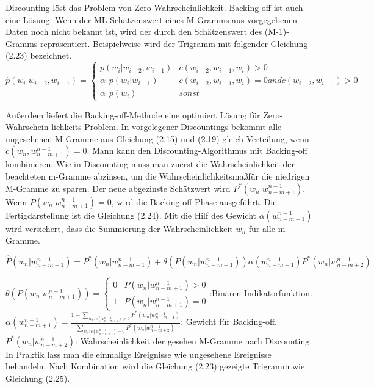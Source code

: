Discounting l\"ost das Problem von Zero-Wahrscheinlichkeit. Backing-off ist auch eine L\"osung. Wenn der ML-Sch\"atzenswert eines M-Gramms aus vorgegebenen Daten noch nicht bekannt ist, wird der durch den Sch\"atzenswert des (M-1)-Gramms repr\"asentiert. Beispielweise wird der Trigramm mit folgender Gleichung (2.23) bezeichnet.
\begin{equation}
\label{equation:backing_off_01}
	\hat{p}(w_{i}|w_{i-2},w_{i-1})=
	\begin{cases}
			p(w_{i}|w_{i-2},w_{i-1}) & c(w_{i-2},w_{i-1},w_{i})>0 \\
			\alpha_{1}p(w_{i}|w_{i-1})& c(w_{i-2},w_{i-1},w_{i})=0 and c(w_{i-2},w_{i-1})>0 \\
			\alpha_{1}p(w_{i}) & sonst 
	\end{cases}
\end{equation}

Au\ss erdem liefert die Backing-off-Methode eine optimiert L\"osung f\"ur Zero-Wahrschein-lichkeits-Problem. In vorgelegener Discountings bekommt alle ungesehenen M-Gramme aus Gleichung (2.15) und (2.19) gleich Verteilung, wenn $c(w_{n},w_{n-m+1}^{n-1})=0$. Mann kann den Discounting-Algorithmus mit Backing-off kombinieren. Wie in Discounting muss man zuerst die Wahrscheinlichkeit der beachteten m-Gramme abzinsen, um die Wahrscheinlichkeitsma\ss f\"ur die niedrigen M-Gramme zu sparen. Der neue  abgezinste Sch\"atzwert wird $P^{*}(w_{n}|w_{n-m+1}^{n-1})$. Wenn $P(w_{n}|w_{n-m+1}^{n-1})=0$, wird die Backing-off-Phase ausgef\"uhrt.  Die Fertigdarstellung ist die Gleichung (2.24).  Mit die Hilf des Gewicht $\alpha(w_{n-m+1}^{n-1})$ wird versichert, dass die Summierung der Wahrscheinlichkeit $w_{n}$ f\"ur alle m-Gramme.

\begin{equation}
\label{equation:backing_off_02}
\hat{P}(w_{n}|w_{n-m+1}^{n-1})=P^{*}(w_{n}|w_{n-m+1}^{n-1})+\theta(P(w_{n}|w_{n-m+1}^{n-1}))\alpha(w_{n-m+1}^{n-1})P^{*}(w_{n}|w_{n-m+2}^{n-1})
\end{equation}

$\theta(P(w_{n}|w_{n-m+1}^{n-1}))=\begin{cases} 0 & P(w_{n}|w_{n-m+1}^{n-1})>0 \\ 1 & P(w_{n}|w_{n-m+1}^{n-1})= 0 \end{cases}$:Bin\"aren Indikatorfunktion.\\
$\alpha(w_{n-m+1}^{n-1})=\frac{1-\sum_{w_{n}:c(w_{n-m+1}^{n-1})>0}P^{*}(w_{n}|w_{n-m+1}^{n-1})}{\sum_{w_{n}:c(w_{n-m+1}^{n-1})=0}P^{*}(w_{n}|w_{n-m+2}^{n-1})}$: Gewicht f\"ur Backing-off.\\
$P^{*}(w_{n}|w_{n-m+2}^{n-1})$: Wahrscheinlichkeit der gesehen M-Gramme nach Discounting.\\
In Praktik lass man die einmalige Ereignisse wie ungesehene Ereignisse behandeln. Nach Kombination wird die Gleichung (2.23) gezeigte Trigramm wie Gleichung (2.25).

